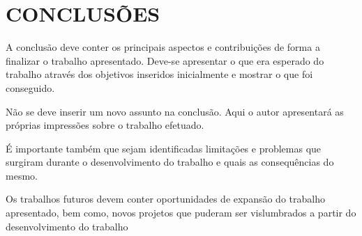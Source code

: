 \chapter{CONCLUSÕES}
A conclusão deve conter os principais aspectos e contribuições de forma a finalizar o trabalho apresentado. Deve-se apresentar o que era esperado do trabalho através dos objetivos inseridos inicialmente e mostrar o que foi conseguido. 

Não se deve inserir um novo assunto na conclusão. Aqui o autor apresentará as próprias impressões sobre o trabalho efetuado. 
    
É importante também que sejam identificadas limitações e problemas que surgiram durante o desenvolvimento do trabalho e quais as consequências do mesmo.

Os trabalhos futuros devem conter oportunidades de expansão do trabalho apresentado, bem como, novos projetos que puderam ser vislumbrados a partir do desenvolvimento do trabalho